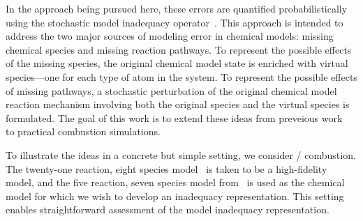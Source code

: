 \documentclass[fontsize=12pt, %
               paper=a4, %
               hyperref]{report}
\begin{document}
  In the approach being pursued here, these errors are quantified
  probabilistically using the stochastic model inadequacy 
  operator~\cite{morrison2016representing}.  This approach is intended to
  address the two major sources of modeling error in chemical models:
  missing chemical species and missing reaction pathways.  To represent
  the possible effects of the missing species, the original chemical
  model state is enriched with virtual species---one for each type of
  atom in the system.  To represent the possible effects of missing
  pathways, a stochastic perturbation of the original chemical model
  reaction mechanism involving both the original species and the virtual
  species is formulated.  The goal of this work is to extend these ideas
  from preveious work~\cite{morrison2016representing} to practical combustion
  simulations.
  
  To illustrate the ideas in a concrete but simple setting, we consider
  / combustion.  The twenty-one reaction, eight species
  model~\cite{williams2008detailed} is taken to be a
  high-fidelity model, and the five reaction, seven species model
  from~\cite{williams2008detailed} is used as the chemical model for
  which we wish to develop an inadequacy representation.  This setting
  enables straightforward assessment of the model inadequacy
  representation.
\end{document}
